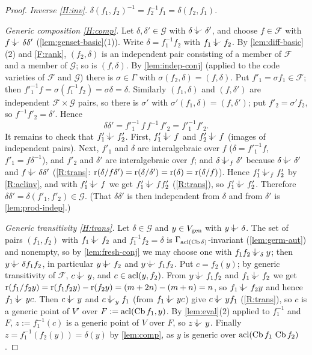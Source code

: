 \begin{proof}
\emph{Inverse \ref{H:inv}.}  $\delta(f_1,f_2)^{-1}=f_2^{-1}f_1=\delta(f_2,f_1)$.

\emph{Generic composition \ref{H:comp}.}  Let $\delta,\delta'\in\mathcal G$ with
$\delta\ind{}\delta'$, and choose $f\in\mathcal F$ with $f\ind{}\delta\delta'$
(\cref{lem:genset-basic}(1)).  Write $\delta=f_1^{-1}f_2$ with $f_1\ind{}f_2$.
By \cref{lem:diff-basic}(2) and \ref{F:rank}, $(f_2,\delta)$ is an independent pair
consisting of a member of $\mathcal F$ and a member of $\mathcal G$; so is $(f,\delta)$.
By \cref{lem:indep-conj} (applied to the code varieties of $\mathcal F$ and $\mathcal G$)
there is $\sigma\in\Gamma$ with $\sigma(f_2,\delta)=(f,\delta)$.  Put $f'_1=\sigma f_1\in\mathcal F$;
then $f'^{-1}_1f=\sigma(f_1^{-1}f_2)=\sigma\delta=\delta$.  Similarly $(f_1,\delta)$ and
$(f,\delta')$ are independent $\mathcal F\times\mathcal G$ pairs, so there is $\sigma'$ with
$\sigma'(f_1,\delta)=(f,\delta')$; put $f'_2=\sigma'f_2$, so $f^{-1}f'_2=\delta'$.  Hence
\[
   \delta\delta'=f'^{-1}_1\,f\,f^{-1}\,f'_2=f'^{-1}_1f'_2 .
\]
It remains to check that $f'_1\ind{}f'_2$.  First, $f'_1\ind{}f$ and $f'_2\ind{}f$ (images of
independent pairs).  Next, $f'_1$ and $\delta$ are interalgebraic over $f$
($\delta=f'^{-1}_1f$, $f'_1=f\delta^{-1}$), and $f'_2$ and $\delta'$ are interalgebraic
over $f$; and $\delta\ind{f}\delta'$ because $\delta\ind{}\delta'$ and $f\ind{}\delta\delta'$
(\ref{R:trans}: $\operatorname{r}(\delta/f\delta')=\operatorname{r}(\delta/\delta')=\operatorname{r}(\delta)=\operatorname{r}(\delta/f)$).
Hence $f'_1\ind{f}f'_2$ by \ref{R:aclinv}, and with $f'_1\ind{}f$ we get $f'_1\ind{}ff'_2$
(\ref{R:trans}), so $f'_1\ind{}f'_2$.  Therefore $\delta\delta'=\delta(f'_1,f'_2)\in\mathcal G$.
(That $\delta\delta'$ is then independent from $\delta$ and from $\delta'$ is
\cref{lem:prod-indep}.)

\emph{Generic transitivity \ref{H:trans}.}  Let $\delta\in\mathcal G$ and $y\in V_{\operatorname{gen}}$
with $y\ind{}\delta$.  The set of pairs $(f_1,f_2)$ with $f_1\ind{}f_2$ and
$f_1^{-1}f_2=\delta$ is $\Gamma_{\operatorname{acl}(\operatorname{Cb}\delta)}$-invariant (\cref{lem:germ-aut}) and
nonempty, so by \cref{lem:fresh-conj} we may choose one with $f_1f_2\ind{\delta}y$; then
$y\ind{}\delta f_1f_2$, in particular $y\ind{}f_2$ and $y\ind{}f_1f_2$.  Put $c=f_2(y)$;
by generic transitivity of $\mathcal F$, $c\ind{}y$, and $c\in\operatorname{acl}(y,f_2)$.  From
$y\ind{}f_1f_2$ and $f_1\ind{}f_2$ we get $\operatorname{r}(f_1/f_2y)=\operatorname{r}(f_1f_2y)-\operatorname{r}(f_2y)=
(m+2n)-(m+n)=n$, so $f_1\ind{}f_2y$ and hence $f_1\ind{}yc$.  Then $c\ind{}y$ and
$c\ind{y}f_1$ (from $f_1\ind{}yc$) give $c\ind{}yf_1$ (\ref{R:trans}), so $c$ is a generic
point of $V'$ over $F:=\operatorname{acl}(\operatorname{Cb} f_1,y)$.  By \cref{lem:eval}(2) applied to $f_1^{-1}$ and
$F$, $z:=f_1^{-1}(c)$ is a generic point of $V$ over $F$, so $z\ind{}y$.  Finally
$z=f_1^{-1}(f_2(y))=\delta(y)$ by \cref{lem:comp}, as $y$ is generic over
$\operatorname{acl}(\operatorname{Cb} f_1\,\operatorname{Cb} f_2)$.


\end{proof}
